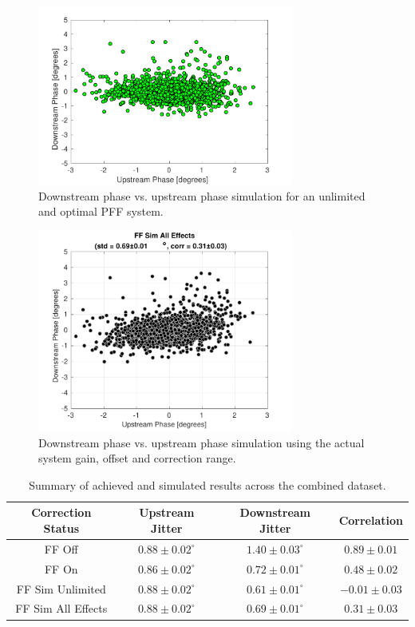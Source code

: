 \begin{figure}
  \centering
  \includegraphics[width=0.75\textwidth]{Figures/feedforward/longFF_scatterFFSimOpt}
  \caption{Downstream phase vs. upstream phase simulation for an unlimited and optimal PFF system.}
  \label{f:longFF_scatterFFSimOpt}
\end{figure}

\begin{figure}
  \centering
  \includegraphics[width=0.75\textwidth]{Figures/feedforward/longFF_scatterFFSimReal}
  \caption{Downstream phase vs. upstream phase simulation using the actual system gain, offset and correction range.}
  \label{f:longFF_scatterFFSimReal}
\end{figure}

\begin{table}
  \begin{center}
    \begin{tabular}{| c | c | c | c |}
	   \hline
       Correction Status & Upstream Jitter & Downstream Jitter & Correlation \\ \hline
       FF Off & \(0.88\pm0.02^\circ\) & \(1.40\pm0.03^\circ\) & \(0.89\pm0.01\) \\
	   FF On & \(0.86\pm0.02^\circ\) & \(0.72\pm0.01^\circ\) & \(0.48\pm0.02\) \\
	   FF Sim Unlimited & \(0.88\pm0.02^\circ\) & \(0.61\pm0.01^\circ\) & \(-0.01\pm0.03\) \\
	   FF Sim All Effects & \(0.88\pm0.02^\circ\) & \(0.69\pm0.01^\circ\) & \(0.31\pm0.03\) \\
    \hline
    \end{tabular}
    \caption{Summary of achieved and simulated results across the combined dataset.}
  	\label{t:LongFF}
  \end{center}
\end{table}



